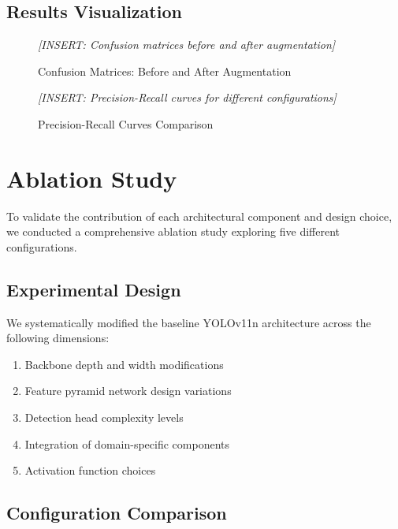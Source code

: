 \documentclass[11pt,a4paper]{article}
\begin{document}
\subsection{Results Visualization}

\begin{figure}[H]
    \centering
    \textit{[INSERT: Confusion matrices before and after augmentation]}
    \caption{Confusion Matrices: Before and After Augmentation}
    \label{fig:confusion_matrices}
\end{figure}

\begin{figure}[H]
    \centering
    \textit{[INSERT: Precision-Recall curves for different configurations]}
    \caption{Precision-Recall Curves Comparison}
    \label{fig:pr_curves}
\end{figure}


\section{Ablation Study}
\label{sec:ablation}

To validate the contribution of each architectural component and design choice, we conducted a comprehensive 
ablation study exploring five different configurations.

\subsection{Experimental Design}

We systematically modified the baseline YOLOv11n architecture across the following dimensions:
\begin{enumerate}
    \item Backbone depth and width modifications
    \item Feature pyramid network design variations
    \item Detection head complexity levels
    \item Integration of domain-specific components
    \item Activation function choices
\end{enumerate}

\subsection{Configuration Comparison}
\end{document}
